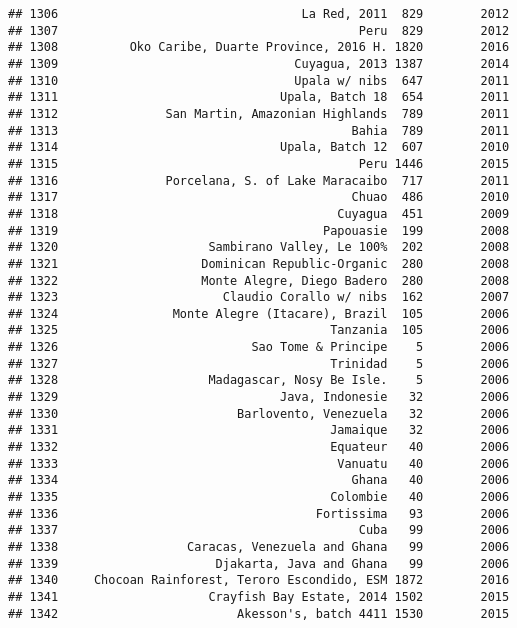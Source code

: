 \documentclass[
]{article}
\begin{document}
\begin{verbatim}
## 1306                                  La Red, 2011  829        2012
## 1307                                          Peru  829        2012
## 1308          Oko Caribe, Duarte Province, 2016 H. 1820        2016
## 1309                                 Cuyagua, 2013 1387        2014
## 1310                                 Upala w/ nibs  647        2011
## 1311                               Upala, Batch 18  654        2011
## 1312               San Martin, Amazonian Highlands  789        2011
## 1313                                         Bahia  789        2011
## 1314                               Upala, Batch 12  607        2010
## 1315                                          Peru 1446        2015
## 1316               Porcelana, S. of Lake Maracaibo  717        2011
## 1317                                         Chuao  486        2010
## 1318                                       Cuyagua  451        2009
## 1319                                     Papouasie  199        2008
## 1320                     Sambirano Valley, Le 100%  202        2008
## 1321                    Dominican Republic-Organic  280        2008
## 1322                    Monte Alegre, Diego Badero  280        2008
## 1323                       Claudio Corallo w/ nibs  162        2007
## 1324                Monte Alegre (Itacare), Brazil  105        2006
## 1325                                      Tanzania  105        2006
## 1326                           Sao Tome & Principe    5        2006
## 1327                                      Trinidad    5        2006
## 1328                     Madagascar, Nosy Be Isle.    5        2006
## 1329                               Java, Indonesie   32        2006
## 1330                         Barlovento, Venezuela   32        2006
## 1331                                      Jamaique   32        2006
## 1332                                      Equateur   40        2006
## 1333                                       Vanuatu   40        2006
## 1334                                         Ghana   40        2006
## 1335                                      Colombie   40        2006
## 1336                                    Fortissima   93        2006
## 1337                                          Cuba   99        2006
## 1338                  Caracas, Venezuela and Ghana   99        2006
## 1339                      Djakarta, Java and Ghana   99        2006
## 1340     Chocoan Rainforest, Teroro Escondido, ESM 1872        2016
## 1341                     Crayfish Bay Estate, 2014 1502        2015
## 1342                         Akesson's, batch 4411 1530        2015

\end{verbatim}
\end{document}
